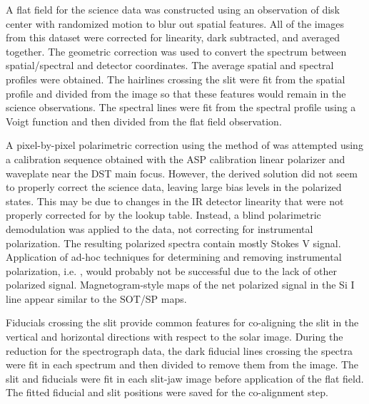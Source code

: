 \documentclass[twocolumn]{aastex62}
\begin{document}
A flat field for the science data was constructed using an observation of disk center with randomized motion to blur out spatial features.  All of the images from this dataset were corrected for linearity, dark subtracted, and averaged together.  The geometric correction was used to convert the spectrum between spatial/spectral and detector coordinates.  The average spatial and spectral profiles were obtained.  The hairlines crossing the slit were fit from the spatial profile and divided from the image so that these features would remain in the science observations.  The spectral lines were fit from the spectral profile using a Voigt function and then divided from the flat field observation.

A pixel-by-pixel polarimetric correction using the method of \cite{2013Schad} was attempted using a calibration sequence obtained with the ASP calibration linear polarizer and waveplate near the DST main focus.  However, the derived solution did not seem to properly correct the science data, leaving large bias levels in the polarized states.  This may be due to changes in the IR detector linearity that were not properly corrected for by the lookup table.  Instead, a blind polarimetric demodulation was applied to the data, not correcting for instrumental polarization.  The resulting polarized spectra contain mostly Stokes V signal.  Application of ad-hoc techniques for determining and removing instrumental polarization, i.e. \citet{collados03}, would probably not be successful due to the lack of other polarized signal.  Magnetogram-style maps of the net polarized signal in the Si I line appear similar to the SOT/SP maps.

Fiducials crossing the slit provide common features for co-aligning the slit in the vertical and horizontal directions with respect to the solar image.  During the reduction for the spectrograph data, the dark fiducial lines crossing the spectra were fit in each spectrum and then divided to remove them from the image.  The slit and fiducials were fit in each slit-jaw image before application of the flat field.  The fitted fiducial and slit positions were saved for the co-alignment step.
\end{document}
